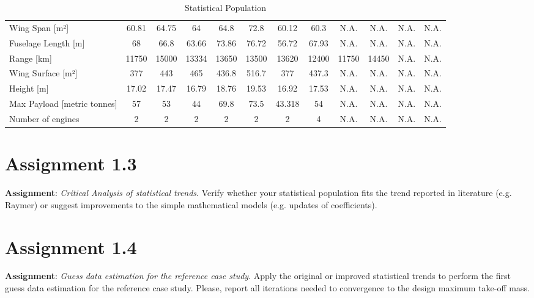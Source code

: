 \documentclass{article}
\begin{document}
\begin{landscape}
\begin{table}[]
{\begin{tabular}{@{}lccccccccccc@{}}
    \cellcolor[HTML]{FCF1B3}Wing Span {[}m²{]}              & 60.81 & 64.75 & 64    & 64.8  & 72.8  & 60.12  & 60.3  & N.A.  & N.A.  & N.A. & N.A. \\
    \rowcolor[HTML]{EFEFEF} 
    \cellcolor[HTML]{FFEF98}Fuselage Length {[}m{]}         & 68    & 66.8  & 63.66 & 73.86 & 76.72 & 56.72  & 67.93 & N.A.  & N.A.  & N.A. & N.A. \\
    \cellcolor[HTML]{FCF1B3}Range {[}km{]}                  & 11750 & 15000 & 13334 & 13650 & 13500 & 13620  & 12400 & 11750 & 14450 & N.A. & N.A. \\
    \rowcolor[HTML]{EFEFEF} 
    \cellcolor[HTML]{FFEF98}Wing Surface {[}m²{]}           & 377   & 443   & 465   & 436.8 & 516.7 & 377    & 437.3 & N.A.  & N.A.  & N.A. & N.A. \\
    \cellcolor[HTML]{FCF1B3}Height {[}m{]}                  & 17.02 & 17.47 & 16.79 & 18.76 & 19.53 & 16.92  & 17.53 & N.A.  & N.A.  & N.A. & N.A. \\
    \rowcolor[HTML]{EFEFEF} 
    \cellcolor[HTML]{FFEF98}Max Payload {[}metric tonnes{]} & 57    & 53    & 44    & 69.8  & 73.5  & 43.318 & 54    & N.A.  & N.A.  & N.A. & N.A. \\
    \cellcolor[HTML]{FCF1B3}Number of engines               & 2     & 2     & 2     & 2     & 2     & 2      & 4     & N.A.  & N.A.  & N.A. & N.A.
    \end{tabular}%
    }
    \caption{Statistical Population}
    \label{tab:stat_pop}
    \end{table}
\end{landscape}

    \clearpage
    \newpage

    \clearpage
\section{Assignment 1.3\label{Assignment_1.3}}
\textbf{Assignment}: \textit{Critical Analysis of statistical trends}.
Verify whether your statistical population fits the trend reported in
literature (e.g. Raymer) or suggest improvements to the simple
mathematical models (e.g. updates of coefficients).

\pagebreak
\section{Assignment 1.4\label{Assignments_1.4}}
\textbf{Assignment}: \textit{Guess data estimation for the reference
case study}. Apply the original or improved statistical trends to
perform the first guess data estimation for the reference case
study. Please, report all iterations needed to convergence to the
design maximum take-off mass.
\pagebreak

\printbibliography
    
\end{document}
